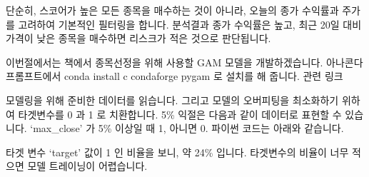 \documentclass[letterpaper,10pt,english]{jupyterBook}
\begin{document}
\sphinxAtStartPar
단순히, 스코어가 높은 모든 종목을 매수하는 것이 아니라,  오늘의 종가 수익률과 주가를 고려하여 기본적인 필터링을 합니다. 분석결과 종가 수익률은 높고, 최근 20일 대비 가격이 낮은 종목을 매수하면 리스크가 적은 것으로 판단됩니다.

\sphinxAtStartPar
이번절에서는 책에서 종목선정을 위해 사용할 GAM 모델을 개발하겠습니다. 아나콘다 프롬프트에서 conda install \sphinxhyphen{}c conda\sphinxhyphen{}forge pygam 로 설치를 해 줍니다. 관련 링크 

\sphinxAtStartPar
모델링을 위해 준비한 데이터를 읽습니다. 그리고 모델의 오버피팅을 최소화하기 위하여 타겟변수를 0 과 1 로 치환합니다. 5\% 익절은 다음과 같이 데이터로 표현할 수 있습니다. \sphinxhyphen{} ‘max\_close’ 가 5\% 이상일 때 1, 아니면 0. 파이썬 코드는 아래와 같습니다.

\begin{sphinxVerbatim}[commandchars=\\\{\}]
\PYG{p}{[}\PYG{p}{]}   
\end{sphinxVerbatim}

\sphinxAtStartPar
타겟 변수 \sphinxhyphen{} ‘target’ 값이 1 인 비율을 보니, 약 24\% 입니다. 타겟변수의 비율이 너무 적으면 모델 트레이닝이 어렵습니다.
\end{document}
